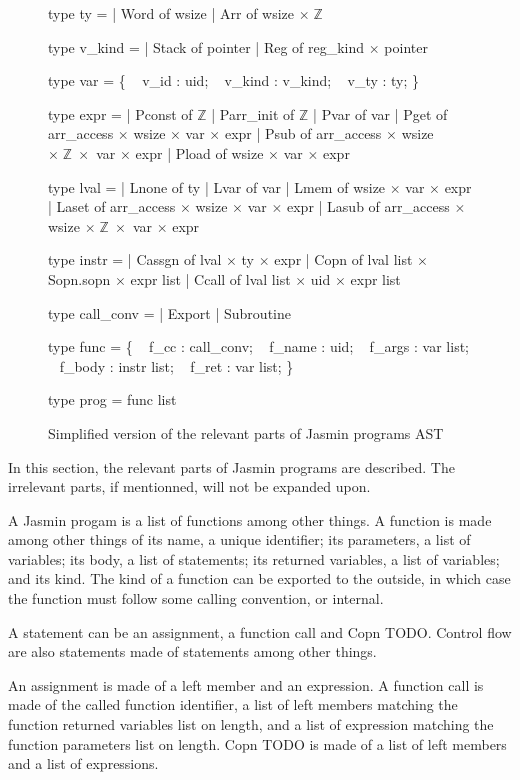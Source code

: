 \documentclass{article}
\newcommand\setZ{\mathbb{Z}}
\begin{document}
\begin{figure}
\obeylines\obeyspaces\ttfamily%
type ty =
| Word of wsize
| Arr  of wsize \(\times\;\setZ\)

type v\_kind =
| Stack of pointer
| Reg   of reg\_kind \(\times\) pointer

type var = \{
~ v\_id   : uid;
~ v\_kind : v\_kind;
~ v\_ty   : ty;
\}

type expr =
| Pconst of \(\setZ\)
| Parr\_init of \(\setZ\)
| Pvar   of var
| Pget   of arr\_access \(\times\) wsize \(\times\) var \(\times\) expr
| Psub   of arr\_access \(\times\) wsize \(\times\;\setZ\;\times\) var \(\times\) expr
| Pload  of wsize \(\times\) var \(\times\) expr

type lval =
| Lnone of ty
| Lvar  of var
| Lmem  of wsize \(\times\) var \(\times\) expr
| Laset of arr\_access \(\times\) wsize \(\times\) var \(\times\) expr
| Lasub of arr\_access \(\times\) wsize \(\times\;\setZ\;\times\) var \(\times\) expr

type instr =
| Cassgn of lval \(\times\) ty \(\times\) expr
| Copn   of lval list \(\times\) Sopn.sopn \(\times\) expr list
| Ccall  of lval list \(\times\) uid \(\times\) expr list

type call\_conv =
| Export
| Subroutine

type func = \{
~ f\_cc   : call\_conv;
~ f\_name : uid;
~ f\_args : var list;
~ f\_body : instr list;
~ f\_ret  : var list;
\}

type prog = func list

\caption{Simplified version of the relevant parts of Jasmin programs AST}
\end{figure}

In this section, the relevant parts of Jasmin programs are described. The
irrelevant parts, if mentionned, will not be expanded upon.

A Jasmin progam is a list of functions among other things. A function is made
among other things of its name, a unique identifier; its parameters, a list of
variables; its body, a list of statements; its returned variables, a list of
variables; and its kind. The kind of a function can be exported to the outside,
in which case the function must follow some calling convention, or internal.

\smallskip

A statement can be an assignment, a function call and Copn TODO.
Control flow are also statements made of statements among other things.

An assignment is made of a left member and an expression. A function call is
made of the called function identifier, a list of left members matching the
function returned variables list on length, and a list of expression matching
the function parameters list on length. Copn TODO is made of a list of left members and a list of expressions.
\end{document}
